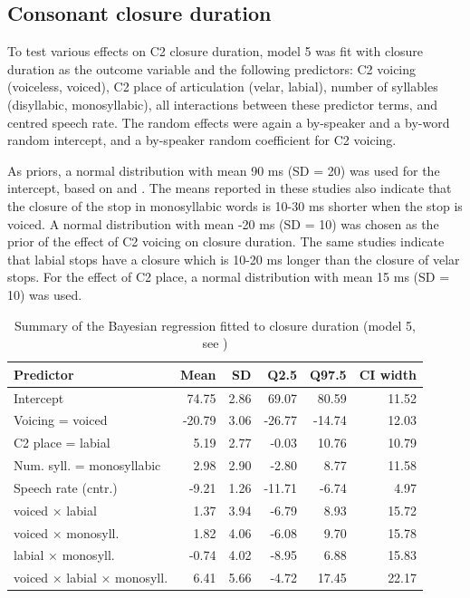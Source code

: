 \documentclass[12pt,a4paper,]{article}
\begin{document}
\hypertarget{consonant-closure-duration}{%
\subsection{Consonant closure
duration}\label{consonant-closure-duration}}

\label{s:clos}

To test various effects on C2 closure duration, model 5 was fit with
closure duration as the outcome variable and the following predictors:
C2 voicing (voiceless, voiced), C2 place of articulation (velar,
labial), number of syllables (disyllabic, monosyllabic), all
interactions between these predictor terms, and centred speech rate. The
random effects were again a by-speaker and a by-word random intercept,
and a by-speaker random coefficient for C2 voicing.

As priors, a normal distribution with mean 90 ms (SD = 20) was used for
the intercept, based on \citet{sharf1962} and \citet{luce1985}. The
means reported in these studies also indicate that the closure of the
stop in monosyllabic words is 10-30 ms shorter when the stop is voiced.
A normal distribution with mean -20 ms (SD = 10) was chosen as the prior
of the effect of C2 voicing on closure duration. The same studies
indicate that labial stops have a closure which is 10-20 ms longer than
the closure of velar stops. For the effect of C2 place, a normal
distribution with mean 15 ms (SD = 10) was used.

\begin{table}

\caption{\label{tab:clos-5-table}Summary of the Bayesian regression fitted to closure duration (model 5, see )}
\centering
\fontsize{8}{10}\selectfont
\begin{tabular}[t]{lrrrrr}
\toprule
Predictor & Mean & SD & Q2.5 & Q97.5 & CI width\\
\midrule
Intercept & 74.75 & 2.86 & 69.07 & 80.59 & 11.52\\
Voicing = voiced & -20.79 & 3.06 & -26.77 & -14.74 & 12.03\\
C2 place = labial & 5.19 & 2.77 & -0.03 & 10.76 & 10.79\\
Num. syll. = monosyllabic & 2.98 & 2.90 & -2.80 & 8.77 & 11.58\\
Speech rate (cntr.) & -9.21 & 1.26 & -11.71 & -6.74 & 4.97\\
voiced × labial & 1.37 & 3.94 & -6.79 & 8.93 & 15.72\\
voiced × monosyll. & 1.82 & 4.06 & -6.08 & 9.70 & 15.78\\
labial × monosyll. & -0.74 & 4.02 & -8.95 & 6.88 & 15.83\\
voiced × labial × monosyll. & 6.41 & 5.66 & -4.72 & 17.45 & 22.17\\
\bottomrule
\end{tabular}
\end{table}
\end{document}
